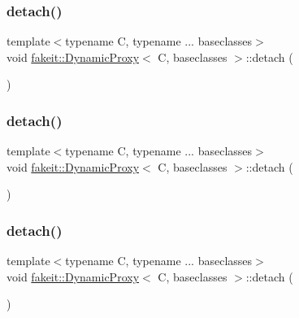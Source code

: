 \subsubsection{\texorpdfstring{detach()}{detach()}\hspace{0.1cm}{\footnotesize\ttfamily [2/9]}}
{\footnotesize\ttfamily template$<$typename C, typename ... baseclasses$>$ \\
void \mbox{\hyperlink{structfakeit_1_1DynamicProxy}{fakeit\+::\+Dynamic\+Proxy}}$<$ C, baseclasses $>$\+::detach (\begin{DoxyParamCaption}{ }\end{DoxyParamCaption})\hspace{0.3cm}{\ttfamily [inline]}}

\mbox{\label{structfakeit_1_1DynamicProxy_a154f25eeeb36c0635d9209dd5870943e}} 
\subsubsection{\texorpdfstring{detach()}{detach()}\hspace{0.1cm}{\footnotesize\ttfamily [3/9]}}
{\footnotesize\ttfamily template$<$typename C, typename ... baseclasses$>$ \\
void \mbox{\hyperlink{structfakeit_1_1DynamicProxy}{fakeit\+::\+Dynamic\+Proxy}}$<$ C, baseclasses $>$\+::detach (\begin{DoxyParamCaption}{ }\end{DoxyParamCaption})\hspace{0.3cm}{\ttfamily [inline]}}

\mbox{\label{structfakeit_1_1DynamicProxy_a154f25eeeb36c0635d9209dd5870943e}} 
\subsubsection{\texorpdfstring{detach()}{detach()}\hspace{0.1cm}{\footnotesize\ttfamily [4/9]}}
{\footnotesize\ttfamily template$<$typename C, typename ... baseclasses$>$ \\
void \mbox{\hyperlink{structfakeit_1_1DynamicProxy}{fakeit\+::\+Dynamic\+Proxy}}$<$ C, baseclasses $>$\+::detach (\begin{DoxyParamCaption}{ }\end{DoxyParamCaption})\hspace{0.3cm}{\ttfamily [inline]}}

